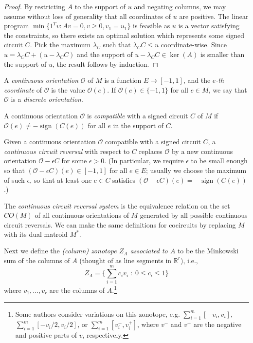 \documentclass[12pt]{amsart}
\numberwithin{equation}{section}
\theoremstyle{definition}
\newcommand{\sign}{\operatorname{sign}}
\begin{document}
\begin{proof} By restricting $A$ to the support of $u$ and negating columns, we may assume without loss of generality that all coordinates of $u$ are positive. The linear program $\min\{1^Tv: Av=0,v\geq 0, v_1=u_1\}$ is feasible as $u$ is a vector satisfying the constraints, so there exists an optimal solution which represents some signed circuit $C$. Pick the maximum $\lambda_C$ such that $\lambda_C C\leq u$ coordinate-wise. Since $u=\lambda_C C+(u-\lambda_C C)$ and the support of $u-\lambda_C C\in\ker(A)$ is smaller than the support of $u$, the result follows by induction.
\end{proof}

\medskip


A {\em continuous orientation} ${\mathcal O}$ of $M$ is a function $E \to [-1,1]$, and the {\em $e$-th coordinate} of $\mathcal{O}$ is the value $\mathcal{O}(e)$.  If ${\mathcal O}(e) \in \{-1,1\}$ for all $e \in M$, we say that ${\mathcal O}$ is a {\em discrete orientation}.

A continuous orientation ${\mathcal O}$ is {\em compatible} with a signed circuit $C$ of $M$ if ${\mathcal O}(e) \neq -\sign(C(e))$ for all $e$ in the support of $C$. 

Given a continuous orientation ${\mathcal O}$ compatible with a signed circuit $C$, a {\em continuous circuit reversal} with respect to $C$ replaces ${\mathcal O}$ by a new continuous orientation ${\mathcal O}-\epsilon C$ for some $\epsilon > 0$.  
(In particular, we require $\epsilon$ to be small enough so that $({\mathcal O}-\epsilon C)(e) \in [-1,1]$ for all $e \in E$; usually we choose the maximum of such $\epsilon$, so that at least one $e\in C$ satisfies $({\mathcal O}-\epsilon C)(e)=-\sign(C(e))$.)

The {\em continuous circuit reversal system} is the equivalence relation on the set $CO(M)$ of all continuous orientations of $M$ generated by all possible continuous circuit reversals. We can make the same definitions for cocircuits by replacing $M$ with its dual matroid $M^*$.

\medskip

Next we define the {\em (column) zonotope $Z_A$ associated to $A$} to be the Minkowski sum of the columns of $A$ (thought of as line segments in ${\mathbb R}^r$), i.e.,
\[
Z_A = \{ \sum_{i=1}^m c_i v_i \; : \; 0 \leq c_i \leq 1 \}
\]
where $v_1,\ldots,v_r$ are the columns of $A$.\footnote{Some authors consider variations on this zonotope, e.g. $\sum_{i=1}^m[-v_i,v_i]$, $\sum_{i=1}^m[-v_i/2,v_i/2]$, or $\sum_{i=1}^m[v_i^-,v_i^+]$, where $v^-$ and $v^+$ are the negative and positive parts of $v$, respectively.}
\end{document}
